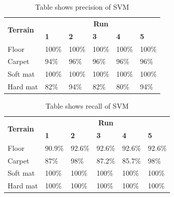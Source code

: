 \documentclass[USenglish]{ifimaster}  %
\begin{document}
	\begin{table}[h]
		\centering
		\begin{tabular}{@{}llllll@{}}
			\toprule
			\multirow{2}{*}{\textbf{Terrain}} & \multicolumn{5}{c}{\textbf{Run}} \\ \cmidrule(l){2-6} 
			& \multicolumn{1}{l|}{\textbf{1}} & \multicolumn{1}{l|}{\textbf{2}} & \multicolumn{1}{l|}{\textbf{3}} & \multicolumn{1}{l|}{\textbf{4}} & \textbf{5} \\ \midrule
			\multicolumn{1}{l|}{Floor} & \multicolumn{1}{l|}{100\%} & \multicolumn{1}{l|}{100\%} & \multicolumn{1}{l|}{100\%} & \multicolumn{1}{l|}{100\%} & 100\% \\ \midrule
			\multicolumn{1}{l|}{Carpet} & \multicolumn{1}{l|}{94\%} & \multicolumn{1}{l|}{96\%} & \multicolumn{1}{l|}{96\%} & \multicolumn{1}{l|}{96\%} & 96\% \\ \midrule
			\multicolumn{1}{l|}{Soft mat} & \multicolumn{1}{l|}{100\%} & \multicolumn{1}{l|}{100\%} & \multicolumn{1}{l|}{100\%} & \multicolumn{1}{l|}{100\%} & 100\% \\ \midrule
			\multicolumn{1}{l|}{Hard mat} & \multicolumn{1}{l|}{82\%} & \multicolumn{1}{l|}{94\%} & \multicolumn{1}{l|}{82\%} & \multicolumn{1}{l|}{80\%} & 94\% \\ \bottomrule
		\end{tabular}
		\caption{Table shows precision of SVM}
		\label{pressvm}
	\end{table}
	\FloatBarrier
	
	\begin{table}[h]
		\centering
		\begin{tabular}{@{}llllll@{}}
			\toprule
			\multirow{2}{*}{\textbf{Terrain}} & \multicolumn{5}{c}{\textbf{Run}} \\ \cmidrule(l){2-6} 
			& \multicolumn{1}{l|}{\textbf{1}} & \multicolumn{1}{l|}{\textbf{2}} & \multicolumn{1}{l|}{\textbf{3}} & \multicolumn{1}{l|}{\textbf{4}} & \textbf{5} \\ \midrule
			\multicolumn{1}{l|}{Floor} & \multicolumn{1}{l|}{90.9\%} & \multicolumn{1}{l|}{92.6\%} & \multicolumn{1}{l|}{92.6\%} & \multicolumn{1}{l|}{92.6\%} & 92.6\% \\ \midrule
			\multicolumn{1}{l|}{Carpet} & \multicolumn{1}{l|}{87\%} & \multicolumn{1}{l|}{98\%} & \multicolumn{1}{l|}{87.2\%} & \multicolumn{1}{l|}{85.7\%} & 98\% \\ \midrule
			\multicolumn{1}{l|}{Soft mat} & \multicolumn{1}{l|}{100\%} & \multicolumn{1}{l|}{100\%} & \multicolumn{1}{l|}{100\%} & \multicolumn{1}{l|}{100\%} & 100\% \\ \midrule
			\multicolumn{1}{l|}{Hard mat} & \multicolumn{1}{l|}{100\%} & \multicolumn{1}{l|}{100\%} & \multicolumn{1}{l|}{100\%} & \multicolumn{1}{l|}{100\%} & 100\% \\ \bottomrule
		\end{tabular}
		\caption{Table shows recall of SVM}
		\label{recallsvm}
	\end{table}
	\FloatBarrier
	
\end{document}
